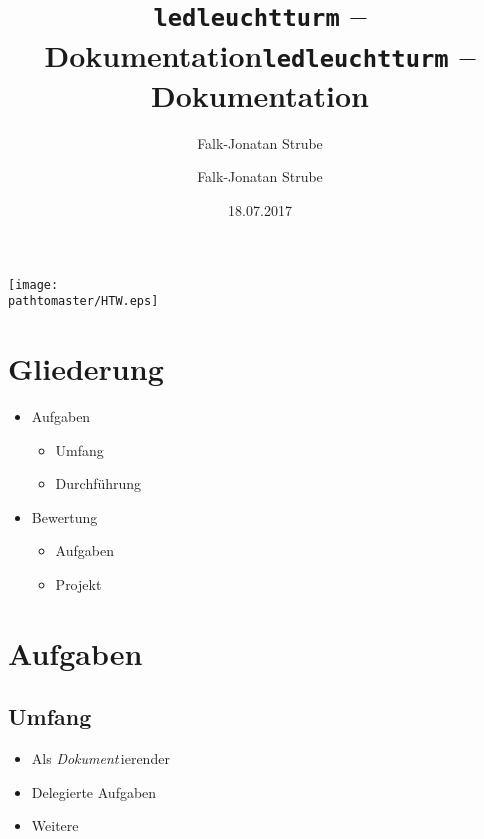 \documentclass[ignorenonframetext, 11pt, table]{beamer}
\author{Falk-Jonatan Strube}
\title{\texttt{ledleuchtturm} -- Dokumentation}
\date{18.07.2017}
\gdef\pathtomaster{../_LaTeX_master}
\begin{document}
\author{Falk-Jonatan Strube}
\title{\texttt{ledleuchtturm} -- Dokumentation}

\begin{frame}[plain]
\begin{center}
\texttt{[image: \\pathtomaster/HTW.eps]}
\end{center}
\maketitle
\end{frame}

\section{Gliederung}
\begin{frame}
\begin{itemize}
\item<2-> Aufgaben
\begin{itemize}
\item<3-> Umfang
\item<4-> Durchführung
\end{itemize}
\item<5-> Bewertung
\begin{itemize}
\item<6-> Aufgaben
\item<7> Projekt
\end{itemize}
\end{itemize}
\end{frame}

\section{Aufgaben}
\subsection{Umfang}
\begin{frame}
\begin{itemize}
\item<2-> Als \emph{Dokument}\,ierender
\item<3-> Delegierte Aufgaben
\item<4-> Weitere
\end{itemize}
\end{frame}
\end{document}
